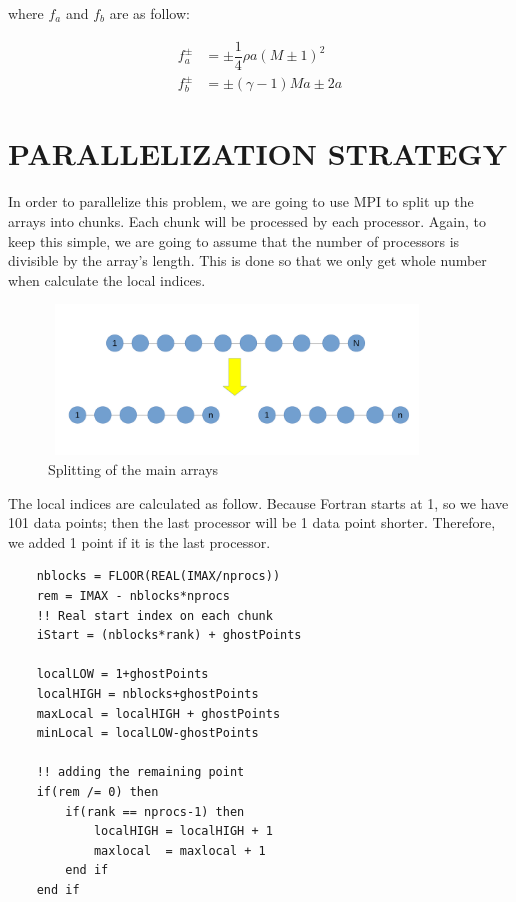 \documentclass[12pt]{article}
\begin{document}
      \noindent
      where $f_a$ and $f_b$ are as follow: 

      \begin{align*}
          f_a^{\pm} &= \pm \dfrac{1}{4}\rho a (M\pm 1)^2\\
          f_b^{\pm} &= \pm (\gamma -1)M a \pm 2a
      \end{align*}


    \newpage
    \section{PARALLELIZATION STRATEGY}

    In order to parallelize this problem, we are going to use MPI to split up the arrays into chunks.  Each chunk will be processed by each processor.  Again, to keep this simple, we are going to assume that the number of processors is divisible by the array's length. This is done so that we only get whole number when calculate the local indices. 
    
    \begin{figure}[H]
        \begin{center}
        \includegraphics[height = 40mm,width = 100mm]{split.png}              
        \caption{Splitting of the main arrays}
        \end{center}  
    \end{figure}
    
    \noindent
    The local indices are calculated as follow. Because Fortran starts at 1, so we have 101 data points; then the last processor will be 1 data point shorter. Therefore, we added 1 point if it is the last processor. 

    \begin{lstlisting}
    nblocks = FLOOR(REAL(IMAX/nprocs))
    rem = IMAX - nblocks*nprocs
    !! Real start index on each chunk
    iStart = (nblocks*rank) + ghostPoints       

    localLOW = 1+ghostPoints
    localHIGH = nblocks+ghostPoints
    maxLocal = localHIGH + ghostPoints
    minLocal = localLOW-ghostPoints

    !! adding the remaining point
    if(rem /= 0) then
        if(rank == nprocs-1) then
            localHIGH = localHIGH + 1
            maxlocal  = maxlocal + 1
        end if
    end if

    \end{lstlisting}
    
\end{document}
